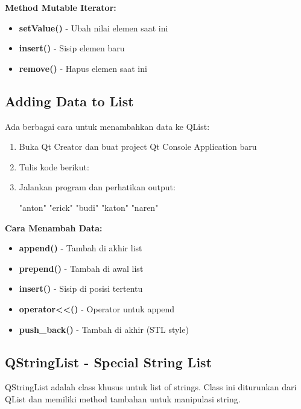 \textbf{Method Mutable Iterator:}
\begin{itemize}
\item \textbf{setValue()} - Ubah nilai elemen saat ini
\item \textbf{insert()} - Sisip elemen baru
\item \textbf{remove()} - Hapus elemen saat ini
\end{itemize}

\subsection{Adding Data to List}

Ada berbagai cara untuk menambahkan data ke QList:

\begin{enumerate}
\item Buka Qt Creator dan buat project Qt Console Application baru
\item Tulis kode berikut:



\item Jalankan program dan perhatikan output:

\begin{lcverbatim}
"anton"
"erick"
"budi"
"katon"
"naren"
\end{lcverbatim}
\end{enumerate}

\textbf{Cara Menambah Data:}
\begin{itemize}
\item \textbf{append()} - Tambah di akhir list
\item \textbf{prepend()} - Tambah di awal list
\item \textbf{insert()} - Sisip di posisi tertentu
\item \textbf{operator<<()} - Operator untuk append
\item \textbf{push\_back()} - Tambah di akhir (STL style)
\end{itemize}

\subsection{QStringList - Special String List}

QStringList adalah class khusus untuk list of strings. Class ini diturunkan dari QList dan memiliki method tambahan untuk manipulasi string.

